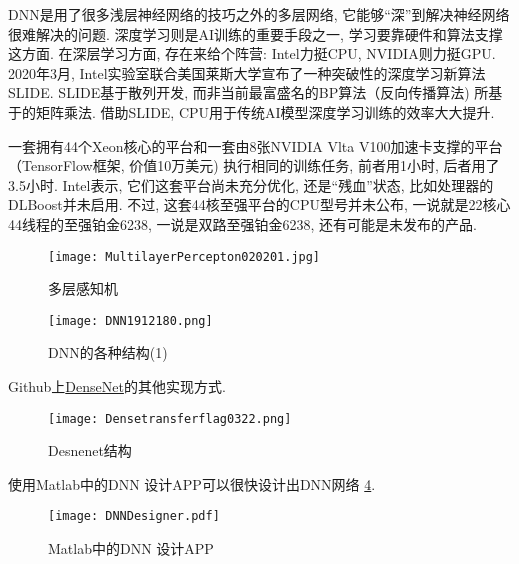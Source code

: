 DNN是用了很多浅层神经网络的技巧之外的多层网络, 它能够“深”到解决神经网络很难解决的问题.
深度学习则是AI训练的重要手段之一,  学习要靠硬件和算法支撑 这方面.
在深层学习方面, 存在来给个阵营: Intel力挺CPU, NVIDIA则力挺GPU.
2020年3月, Intel实验室联合美国莱斯大学宣布了一种突破性的深度学习新算法SLIDE.
SLIDE基于散列开发, 而非当前最富盛名的BP算法（反向传播算法) 所基于的矩阵乘法.
借助SLIDE, CPU用于传统AI模型深度学习训练的效率大大提升.
\begin{exampleT}
    一套拥有44个Xeon核心的平台和一套由8张NVIDIA Vlta V100加速卡支撑的平台（TensorFlow框架, 价值10万美元) 执行相同的训练任务, 前者用1小时, 后者用了3.5小时.
Intel表示, 它们这套平台尚未充分优化, 还是“残血”状态, 比如处理器的DLBoost并未启用.
不过, 这套44核至强平台的CPU型号并未公布, 一说就是22核心44线程的至强铂金6238, 一说是双路至强铂金6238, 还有可能是未发布的产品.
\end{exampleT}
\begin{figure}[H]
\centering
\texttt{[image: MultilayerPercepton020201.jpg]}
\caption{多层感知机}
\label{MultilayerPercepton020201}
\end{figure}
\begin{figure}[H]
\centering
\texttt{[image: DNN1912180.png]}
\caption{DNN的各种结构(1)}
\label{DNN191218121500010}
\end{figure}
Github上\href{https://github.com/zggl/DenseNet}{DenseNet}的其他实现方式.
\begin{figure}[H]
\centering
\texttt{[image: Densetransferflag0322.png]}
\caption{Desnenet结构}
\label{Densetransferflag03220304}
\end{figure}

使用Matlab中的DNN 设计APP可以很快设计出DNN网络 \ref{DNNDesigner20200304}.
\begin{figure}[H]
\centering
\texttt{[image: DNNDesigner.pdf]}
\caption{Matlab中的DNN 设计APP}
\label{DNNDesigner20200304}
\end{figure}
